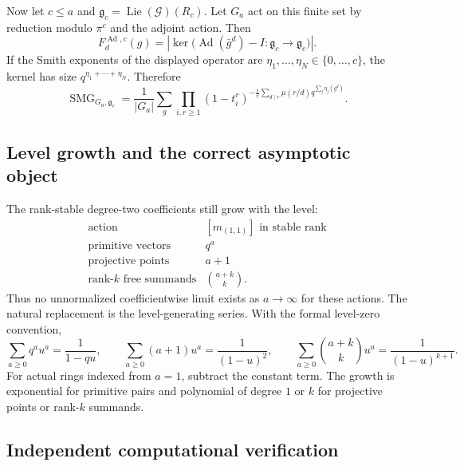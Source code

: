 \documentclass[10pt]{article}
\newcommand{\SMG}{\operatorname{SMG}}
\newcommand{\MGF}{\SMG}
\newcommand{\Ad}{\operatorname{Ad}}
\newcommand{\Lie}{\operatorname{Lie}}
\begin{document}
Now let $c\le a$ and
$\mathfrak g_c=\Lie(\mathcal G)(R_c)$.  Let $G_a$ act on this finite set by
reduction modulo $\pi^c$ and the adjoint action.  Then
\begin{equation}\label{nd:local_ring_actions:eq:adjoint-fixed}
 \boxed{F_d^{\Ad,c}(g)=\left|\ker\bigl(\Ad(\bar g^d)-I:
 \mathfrak g_c\to\mathfrak g_c\bigr)\right|.}
\end{equation}
If the Smith exponents of the displayed operator are
$\eta_1,\ldots,\eta_N\in\{0,\ldots,c\}$, the kernel has size
$q^{\eta_1+\cdots+\eta_N}$.  Therefore
\begin{equation}\label{nd:local_ring_actions:eq:adjoint-smg}
 \boxed{\MGF_{G_a,\mathfrak g_c}=\frac1{|G_a|}\sum_g\prod_{i,r\ge1}
 (1-t_i^r)^{-\frac1r\sum_{d\mid r}\mu(r/d)
 q^{\sum_j\eta_j(g^d)}}.}
\end{equation}

\subsection{Level growth and the correct asymptotic object}

The rank-stable degree-two coefficients still grow with the level:
\[
 \begin{array}{c|c}
 \text{action}&[m_{(1,1)}]\text{ in stable rank}\\ \hline
 \text{primitive vectors}&q^a\\
 \text{projective points}&a+1\\
 \text{rank-$k$ free summands}&\binom{a+k}{k}.
 \end{array}
\]
Thus no unnormalized coefficientwise limit exists as $a\to\infty$ for these
actions.  The natural replacement is the level-generating series.  With the
formal level-zero convention,
\begin{equation}\label{nd:local_ring_actions:eq:level-series}
 \sum_{a\ge0}q^a u^a=\frac1{1-qu},\qquad
 \sum_{a\ge0}(a+1)u^a=\frac1{(1-u)^2},\qquad
 \sum_{a\ge0}\binom{a+k}{k}u^a=\frac1{(1-u)^{k+1}}.
\end{equation}
For actual rings indexed from $a=1$, subtract the constant term.  The growth
is exponential for primitive pairs and polynomial of degree $1$ or $k$ for
projective points or rank-$k$ summands.

\subsection{Independent computational verification}
\end{document}
